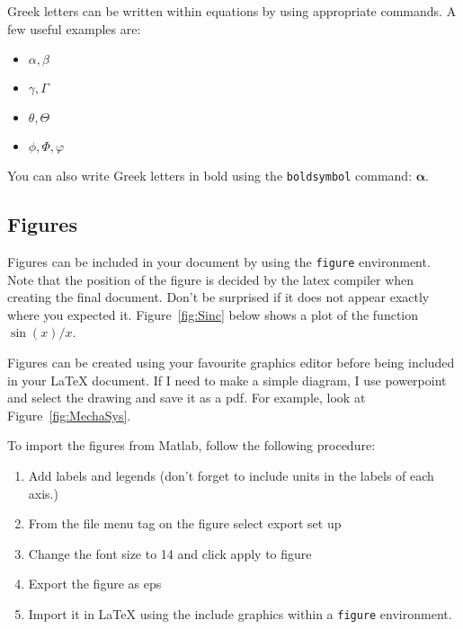 \documentclass{UoNMCHA}
\numberwithin{equation}{section}
\begin{document}
Greek letters can be written within equations by using appropriate commands. A few useful examples are:
\begin{itemize}
\item $\alpha, \beta$
\item $\gamma, \Gamma$
\item $\theta, \Theta$
\item $\phi, \Phi, \varphi$
\end{itemize}
You can also write Greek letters in bold using the \verb|boldsymbol| command: $\boldsymbol{\alpha}$.

\subsection{Figures}
Figures can be included in your document by using the \verb|figure| environment. Note that the position of the figure is decided by the latex compiler when creating the final document. Don't be surprised if it does not appear exactly where you expected it. Figure~\ref{fig:Sinc} below shows a plot of the function $\sin(x)/x$.
\begin{figure}[ht]
    \begin{center}
    \end{center}
\end{figure}

Figures can be created using your favourite graphics editor before being included in your LaTeX document. If I need to make a simple diagram, I use powerpoint and select the drawing and save it as a pdf. For example, look at Figure~\ref{fig:MechaSys}.
\begin{figure}[ht]
    \begin{center}
    \end{center}
\end{figure}

To import the figures from Matlab, follow the following procedure:
\begin{enumerate}
    \item Add labels and legends (don't forget to include units in the labels of each axis.)
    \item From the file menu tag on the figure select export set up
    \item Change the font size to 14 and click apply to figure
    \item Export the figure as eps
    \item Import it in LaTeX using the include graphics within a \verb|figure| environment.
\end{enumerate}
\end{document}
